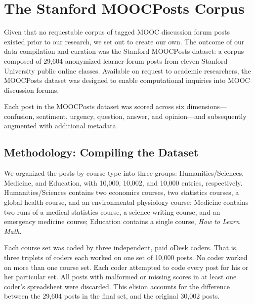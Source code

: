 \documentclass{edm_template}
\begin{document}
\section{The Stanford MOOCPosts Corpus}
\label{sec:MOOCPosts}

Given that no requestable corpus of tagged MOOC discussion forum posts existed prior to our research, we set out to create our own. The outcome of our data compilation and curation was the Stanford MOOCPosts dataset: a corpus composed of 29,604 anonymized learner forum posts from eleven Stanford University public online classes. Available on request to academic researchers, the MOOCPosts dataset was designed to enable computational inquiries into MOOC discussion forums.

Each post in the MOOCPosts dataset was scored across six dimensions---confusion, sentiment, urgency, question, answer, and opinion---and subsequently augmented with additional metadata.


\subsection{Methodology: Compiling the Dataset}
We organized the posts by course type into three groups: Humanities/Sciences, Medicine, and Education, with 10,000, 10,002, and 10,000 entries, respectively. Humanities/Sciences contains two economics courses, two statistics courses, a global health course, and an environmental physiology course; Medicine contains two runs of a medical statistics course, a science writing course, and an emergency medicine course; Education contains a single course, \emph{How to Learn Math}. 

Each course set was coded by three independent, paid oDesk coders. That is, three triplets of coders each worked on one set of 10,000 posts. No coder worked on more than one course set. Each coder attempted to code every post for his or her particular set. All posts with malformed or missing scores in at least one coder's spreadsheet were discarded. This elision accounts for the difference between the 29,604 posts in the final set, and the original 30,002 posts.
\end{document}
